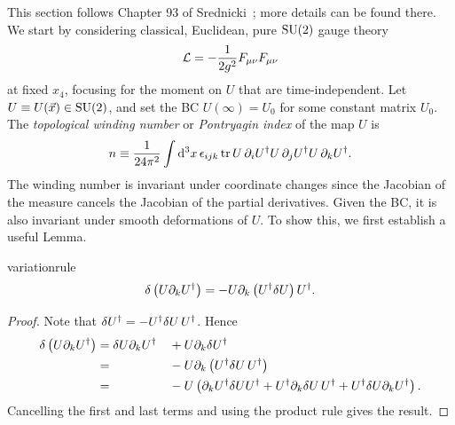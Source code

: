 This section follows Chapter 93 of Srednicki~\cite{srednicki_quantum_2007};
more details can be found there.
We start by considering classical, Euclidean, pure $\operatorname{SU}(2)$ gauge theory
\begin{equation}\label{eq:topaction}
  \mathcal{L}=-\frac{1}{2g^2}F_{\mu\nu}F_{\mu\nu}
\end{equation}
at fixed $x_4$, focusing for the moment on $U$ that are time-independent.
Let $U\equiv U(\vec{x})\in\operatorname{SU}(2)$, and set the BC $U(\infty)=U_0$
for some constant matrix $U_0$.
The {\it topological winding number}
or {\it Pontryagin index} of the map $U$ is
\begin{equation}\label{eq:wn}
  n\equiv\frac{1}{24\pi^2}\int\dd[3]{x}\epsilon_{ijk}
    \tr U\,\partial_iU^\dagger U\,\partial_jU^\dagger
        U\,\partial_kU^\dagger.
\end{equation}
The winding number is invariant under coordinate changes since the Jacobian of
the measure cancels the Jacobian of the partial derivatives.
Given the BC, it is also invariant under smooth deformations of $U$.
To show this, we first establish a useful Lemma.

\begin{lemma}{}{variationrule}
  $$\var\left(U\partial_kU^\dagger\right)
   =-U\partial_k\left(U^\dagger\var U\right)U^\dagger.$$
\begin{proof} Note that $\var U^\dagger=-U^\dagger\var U\,U^\dagger$. Hence
  \begin{alignat*}{2}
   \var\left(U\partial_kU^\dagger\right)
    &=\var U\partial_kU^\dagger&&+U\partial_k\var U^\dagger\\
    &=                           &&-U\partial_k\left(U^\dagger\var
                                                     U\,U^\dagger\right)\\
    &=                           &&-U\left(\partial_kU^\dagger\var UU^\dagger
                                        +U^\dagger\partial_k\var U\,U^\dagger
                                        +U^\dagger\var U\partial_k
                                         U^\dagger                     \right).
  \end{alignat*}
  Cancelling the first and last terms and using the product rule gives the
  result.
\end{proof}
\end{lemma}

